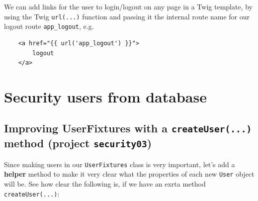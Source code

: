 \documentclass[a4paperpaper,openright]{book}
\newenvironment{Shaded}{}{}
\newcommand{\AnnotationTok}[1]{\textcolor[rgb]{0.38,0.63,0.69}{\textbf{\textit{#1}}}}
\newcommand{\CommentTok}[1]{\textcolor[rgb]{0.38,0.63,0.69}{\textit{#1}}}
\newcommand{\KeywordTok}[1]{\textcolor[rgb]{0.00,0.44,0.13}{\textbf{#1}}}
\newcommand{\NormalTok}[1]{#1}
\newcommand{\OtherTok}[1]{\textcolor[rgb]{0.00,0.44,0.13}{#1}}
\newcommand{\StringTok}[1]{\textcolor[rgb]{0.25,0.44,0.63}{#1}}
\begin{document}
\begin{Shaded}
\end{Shaded}

We can add links for the user to login/logout on any page in a Twig
template, by using the Twig \texttt{url(...)} function and passing it
the internal route name for our logout route \texttt{app\_logout}, e.g.

\begin{verbatim}
    <a href="{{ url('app_logout') }}">
        logout
    </a>
\end{verbatim}

\hypertarget{security-users-from-database}{%
\chapter{Security users from
database}\label{security-users-from-database}}

\hypertarget{improving-userfixtures-with-a-createuser...-method-project-security03}{%
\section{\texorpdfstring{Improving UserFixtures with a
\texttt{createUser(...)} method (project
\texttt{security03})}{Improving UserFixtures with a createUser(...) method (project security03)}}\label{improving-userfixtures-with-a-createuser...-method-project-security03}}

Since making users in our \texttt{UserFixtures} class is very important,
let's add a \textbf{helper} method to make it very clear what the
properties of each new \texttt{User} object will be. See how clear the
following is, if we have an exrta method \texttt{createUser(...)}:
\end{document}
